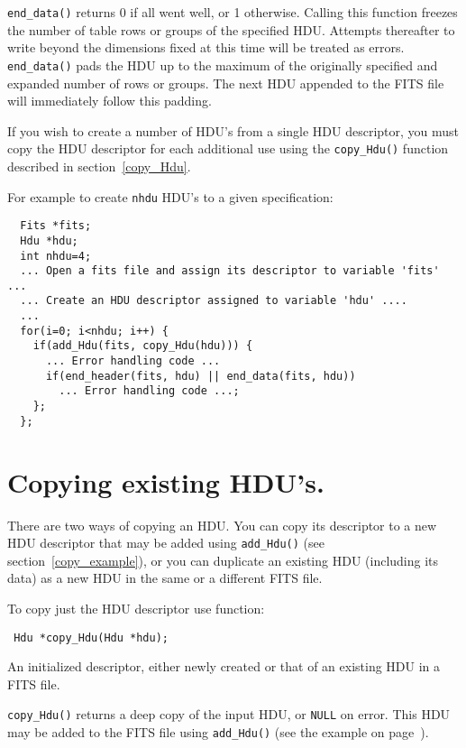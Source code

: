 \verb`end_data()` returns 0 if all went well, or 1 otherwise. Calling
this function freezes the number of table rows or groups of the
specified HDU. Attempts thereafter to write beyond the dimensions
fixed at this time will be treated as errors. \verb`end_data()` pads the
HDU up to the maximum of the originally specified and expanded number
of rows or groups. The next HDU appended to the FITS file will
immediately follow this padding.

If you wish to create a number of HDU's from a single HDU descriptor,
you must copy the HDU descriptor for each additional use using the
\verb`copy_Hdu()` function described in section~\ref{copy_Hdu}.

For example to create \verb`nhdu` HDU's to a given specification:
\label{copy_example}\begin{verbatim}
  Fits *fits;
  Hdu *hdu;
  int nhdu=4;
  ... Open a fits file and assign its descriptor to variable 'fits' ...
  ... Create an HDU descriptor assigned to variable 'hdu' ....
  ...
  for(i=0; i<nhdu; i++) {
    if(add_Hdu(fits, copy_Hdu(hdu))) {
      ... Error handling code ...
      if(end_header(fits, hdu) || end_data(fits, hdu))
        ... Error handling code ...;
    };
  };
\end{verbatim}

\section{Copying existing HDU's.}

There are two ways of copying an HDU. You can copy its descriptor to a
new HDU descriptor that may be added using \verb`add_Hdu()` (see
section~\ref{copy_example}), or you can duplicate an existing HDU
(including its data) as a new HDU in the same or a different FITS
file.

To copy just the HDU descriptor use function:
\label{copy_Hdu}\begin{verbatim}
 Hdu *copy_Hdu(Hdu *hdu);
\end{verbatim}
\begin{arglist}

 An initialized descriptor, either newly created or that of an
           existing HDU in a FITS file.
\end{arglist}

\verb`copy_Hdu()` returns a deep copy of the input HDU, or \verb`NULL` on error.
This HDU may be added to the FITS file using \verb`add_Hdu()` (see the
example on page~\pageref{copy_example}).


